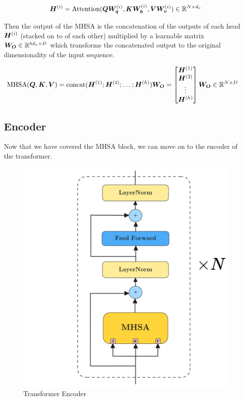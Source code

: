\documentclass[../../main.tex]{subfiles}
\begin{document}
\begin{equation}
	\bm{H}^{(i)} = \text{Attention}(\bm{Q}\bm{W_q}^{(i)}, \bm{K}\bm{W_k}^{(i)}, \bm{V}\bm{W_v}^{(i)}) \in \mathbb{R}^{N \times d_v}
\end{equation}

Then the output of the MHSA is the concatenation of the outputs of each head $\bm{H}^{(i)}$ (stacked on to of each other) multiplied by a learnable matrix $\bm{W_O} \in \mathbb{R}^{hd_v \times D}$ which transforms the concatenated output to the original dimensionality of the input sequence.

\begin{align*}
	 \text{MHSA}(\bm{Q}, \bm{K}, \bm{V}) &= \text{concat}(\bm{H}^{(1)}; \bm{H}^{(2)}; \dots; \bm{H}^{(h)})\bm{W_O} 
	= \begin{bmatrix}
		\bm{H}^{(1)} \\
		\bm{H}^{(2)} \\
		\vdots \\
		\bm{H}^{(h)}
	\end{bmatrix} \bm{W_O} \in \mathbb{R}^{N \times D}
\end{align*}



\subsection{Encoder}

Now that we have covered the MHSA block, we can move on to the encoder of the transformer.

\begin{figure}[H]
	\centering
	\includegraphics[height=0.5\textwidth]{./encoder.png}
	\caption{Transformer Encoder \cite{vaswani2017attention}}
	\label{fig:encoder}
\end{figure}
\end{document}
